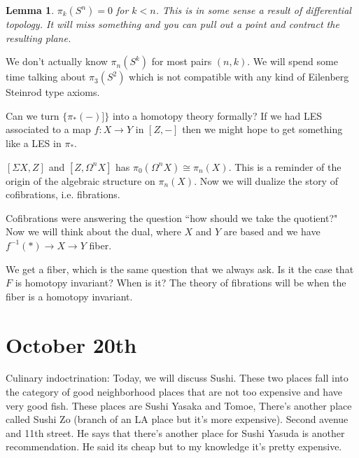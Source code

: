 \documentclass[12pt]{article}
\newtheorem{lemma}[theorem]{Lemma}
\theoremstyle{definition}
\begin{document}
	\begin{lemma}{1}
		$\pi_k(S^n)=0$ for $k<n$. This is in some sense a result of differential topology. It will miss something and you can pull out a point and contract the resulting plane. 
	\end{lemma}
	We don't actually know $\pi_n(S^k)$ for most pairs $(n,k)$. We will spend some time talking about $\pi_3(S^2)$ which is not compatible with any kind of Eilenberg Steinrod type axioms.  
	
	Can we turn $\{\pi_*(-)]\}$ into a homotopy theory formally? If we had LES associated to a map $f:X\to Y$ in $[Z,-]$ then we might hope to get something like a LES in $\pi_*$. 
	
	$[\Sigma X,Z]$ and $[Z,\Omega^n X]$ has $\pi_0(\Omega^n X)\cong \pi_n(X)$. This is a reminder of the origin of the algebraic structure on $\pi_n(X)$. Now we will dualize the story of cofibrations, i.e. fibrations. 
	
	Cofibrations were answering the question ``how should we take the quotient?" Now we will think about the dual, where $X$ and $Y$ are based and we have $f^{-1}(\ast)\to X\to Y$ fiber. 
	\begin{center}
	\end{center}
	We get a fiber, which is the same question that we always ask. Is it the case that $F$ is homotopy invariant?  When is it?  The theory of fibrations will be when the fiber is a homotopy invariant. 
	\begin{center}
	\end{center}
\section{October 20th}
Culinary indoctrination: Today, we will discuss Sushi. These two places fall into the category of good neighborhood places that are not too expensive and have very good fish. These places are Sushi Yasaka and Tomoe, There's another place called Sushi Zo (branch of an LA place but it's more expensive). Second avenue and 11th street. He says that there's another place for Sushi Yasuda is another recommendation. He said its cheap but to my knowledge it's pretty expensive. 
\end{document}

